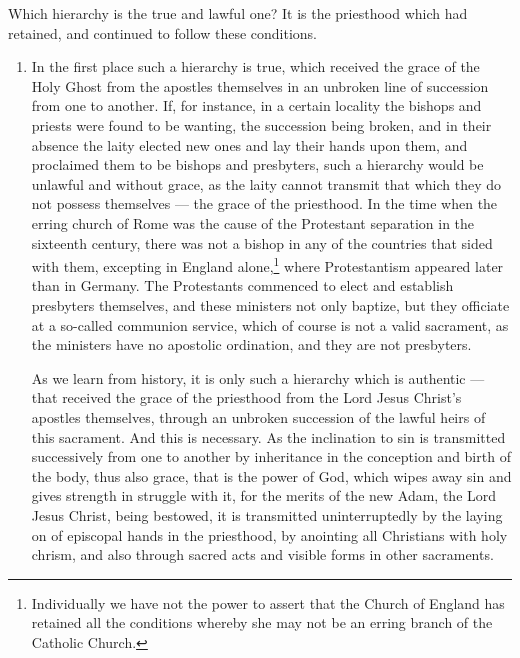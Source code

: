 Which hierarchy is the true and lawful one? 
It is the priesthood which had retained, and 
continued to follow these conditions. 

\begin{enumerate}
    \item In the first place such a hierarchy is true, 
    which received the grace of the Holy Ghost 
    from the apostles themselves in an unbroken 
    line of succession from one to another. If, for 
    instance, in a certain locality the bishops and 
    priests were found to be wanting, the succession
    being broken, and in their absence the 
    laity elected new ones and lay their hands upon 
    them, and proclaimed them to be bishops and 
    presbyters, such a hierarchy would be unlawful
    and without grace, as the laity cannot 
    transmit that which they do not possess themselves 
    — the grace of the priesthood. In the 
    time when the erring church of Rome was the 
    cause of the Protestant separation in the sixteenth
    century, there was not a bishop in any of 
    the countries that sided with them, excepting in 
    England alone,\footnote{Individually we have not the power to assert that 
    the Church of England has retained all the conditions 
    whereby she may not be an erring branch of the Catholic 
    Church.} where Protestantism appeared 
    later than in Germany. The Protestants commenced
    to elect and establish presbyters themselves,
    and these ministers not only baptize, 
    but they officiate at a so-called communion 
    service, which of course is not a valid sacrament,
    as the ministers have no apostolic ordination,
    and they are not presbyters. 

    As we learn from history, it is only such a 
    hierarchy which is authentic — that received 
    the grace of the priesthood from the Lord 
    Jesus Christ's apostles themselves, through an 
    unbroken succession of the lawful heirs of this 
    sacrament. And this is necessary. As the 
    inclination to sin is transmitted successively 
    from one to another by inheritance in the conception
    and birth of the body, thus also grace, 
    that is the power of God, which wipes away sin 
    and gives strength in struggle with it, for the 
    merits of the new Adam, the Lord Jesus Christ, 
    being bestowed, it is transmitted uninterruptedly
    by the laying on of episcopal hands in 
    the priesthood, by anointing all Christians with 
    holy chrism, and also through sacred acts and 
    visible forms in other sacraments. 


\end{enumerate}
